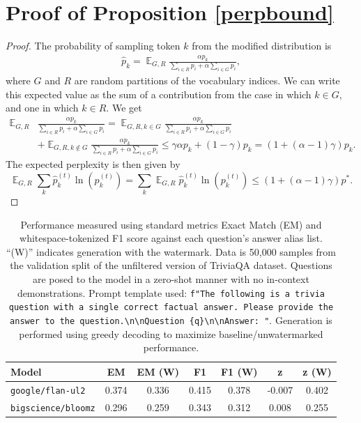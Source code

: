 \documentclass{article}
\theoremstyle{plain}
\theoremstyle{definition}
\theoremstyle{remark}
\DeclareMathOperator*{\expect}{\mathbb{E}}
\begin{document}
\section{Proof of Proposition \ref{perpbound}}
\begin{proof}
The probability of sampling token $k$ from the modified distribution is
   \begin{align}
   \hat p_k =  \expect_{G, R}  \frac{\alpha p_k}{\sum_{i\in R} p_i + \alpha \sum_{i\in G} p_i }, 
 \end{align}
where $G$ and $R$ are random partitions of the vocabulary indices. We can write this expected value as the sum of a contribution from the case in which $k\in G,$ and one in which $k\in R.$  We get 
   \begin{align} 
   \expect_{G, R}&  \frac{\alpha p_k}{\sum_{i\in R} p_i + \alpha \sum_{i\in G} p_i } = \expect_{G, R, k\in G}  \frac{\alpha p_k}{\sum_{i\in R} p_i + \alpha \sum_{i\in G} p_i }\\ & + \expect_{G, R, k\notin G}  \frac{\alpha p_k}{\sum_{i\in R} p_i + \alpha \sum_{i\in G} p_i } 
   \le  \gamma\alpha p_k +  (1-\gamma) p_k = (1+(\alpha-1)\gamma)p_k.
 \end{align}
The expected perplexity is then given by 
 $$  \expect_{G, R} \sum_k \hat p^{(t)}_k \ln(p^{(t)}_k) = \sum_k \expect_{G, R}  \hat p^{(t)}_k \ln(p^{(t)}_k) \le  (1+(\alpha-1)\gamma)p^*.$$
\end{proof}



\begin{table}[h!]
\small
\caption{Performance measured using standard metrics Exact Match (EM) and whitespace-tokenized F1 score against each question's answer alias list. ``(W)'' indicates generation with the watermark. Data is 50,000 samples from the validation split of the unfiltered version of TriviaQA dataset. Questions are posed to the model in a zero-shot manner with no in-context demonstrations. Prompt template used: \texttt{f"The following is a trivia question with a single correct factual answer. Please provide the answer to the question.\textbackslash{}n\textbackslash{}nQuestion \{q\}\textbackslash{}n\textbackslash{}nAnswer: "}. Generation is performed using greedy decoding to maximize baseline/unwatermarked performance.}
\centering
\begin{tabular}{lcccccc}
\toprule
Model & EM & EM (W) & F1 & F1 (W) & z & z (W) \\
\midrule
\texttt{google/flan-ul2} & 0.374 & 0.336 & 0.415 & 0.378 & -0.007 & 0.402 \\
\texttt{bigscience/bloomz} & 0.296 & 0.259 & 0.343 & 0.312 & 0.008 & 0.255 \\
\bottomrule
\end{tabular}\label{tab:trivia-qa}
\end{table}
\end{document}
